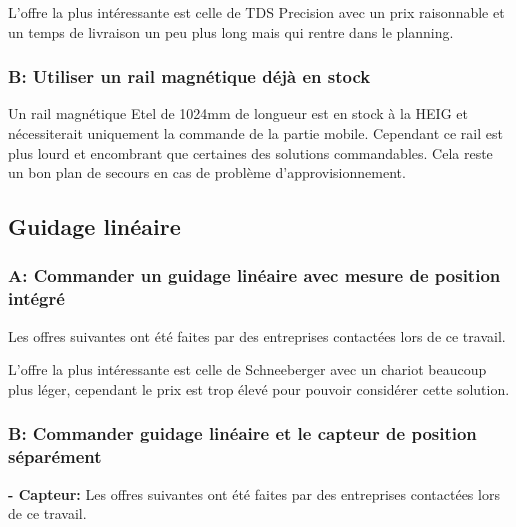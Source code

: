 L'offre la plus intéressante est celle de TDS Precision avec un prix raisonnable et un temps de livraison un peu plus long mais qui rentre dans le planning.

\subsubsection{B: Utiliser un rail magnétique déjà en stock}
Un rail magnétique Etel de 1024mm de longueur est en stock à la HEIG et nécessiterait uniquement la commande de la partie mobile. Cependant ce
rail est plus lourd et encombrant que certaines des solutions commandables. Cela reste un bon plan de secours en cas de problème d'approvisionnement.

\subsection{Guidage linéaire}
\subsubsection{A: Commander un guidage linéaire avec mesure de position intégré}
Les offres suivantes ont été faites par des entreprises contactées lors de ce travail.

\begin{table}[H]
  \centering
  \caption{Offres pour le guidage linéaire avec mesure de position}
  \label{tab:OffreGuidPos}
\end{table}

L'offre la plus intéressante est celle de Schneeberger avec un chariot beaucoup plus léger, cependant le prix est trop élevé pour pouvoir considérer cette solution.

\subsubsection{B: Commander guidage linéaire et le capteur de position séparément}
\textbf{ - Capteur:}
\newline
Les offres suivantes ont été faites par des entreprises contactées lors de ce travail.

